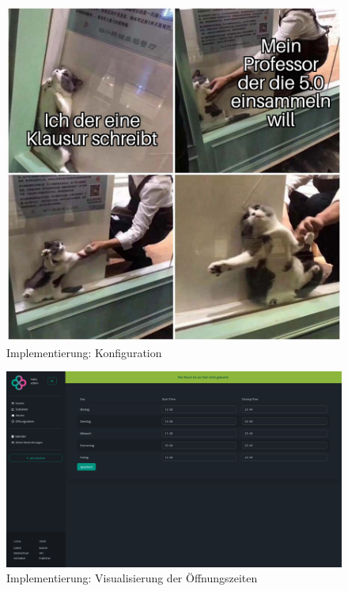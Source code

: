 \begin{figure}[ht]
    \centering
    \includegraphics[width=\textwidth]{figures/impl-views/placeholder} %
    \caption{Implementierung: Konfiguration}
    \label{fig:impl-adminopeninghours_config}
\end{figure}
\begin{figure}[ht]
    \centering
    \includegraphics[width=\textwidth]{figures/impl-views/admin_opening_hours}
    \caption{Implementierung: Visualisierung der Öffnungszeiten}
    \label{fig:impl-adminopeninghours}
\end{figure}
\clearpage

